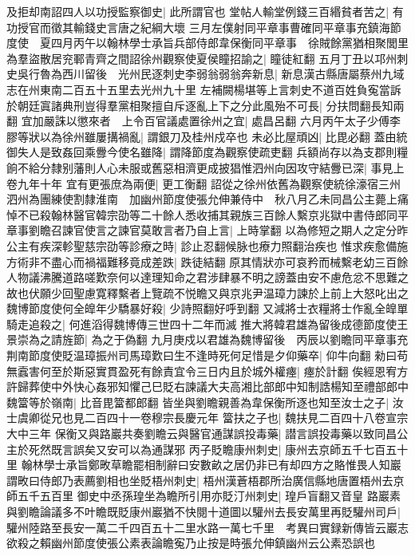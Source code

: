 及拒却南詔四人以功授監察御史|{
	此所謂官也}
堂帖人輸堂例錢三百緡貧者苦之|{
	有功授官而徵其輸錢史言唐之紀綱大壞}
三月左僕射同平章事曹確同平章事充鎮海節度使　夏四月丙午以翰林學士承旨兵部侍郎韋保衡同平章事　徐賊餘黨猶相聚閭里為羣盜散居兖鄆青齊之間詔徐州觀察使夏侯瞳招諭之|{
	瞳徒紅翻}
五月丁丑以邛州刺史吳行魯為西川留後　光州民逐刺史李弱翁弱翁奔新息|{
	新息漢古縣唐屬蔡州九域志在州東南二百五十五里去光州九十里}
左補闕楊堪等上言刺史不道百姓負寃當訴於朝廷寘諸典刑豈得羣黨相聚擅自斥逐亂上下之分此風殆不可長|{
	分扶問翻長知兩翻}
宜加嚴誅以懲來者　上令百官議處置徐州之宜|{
	處昌呂翻}
六月丙午太子少傅李膠等狀以為徐州雖屢搆禍亂|{
	謂銀刀及桂州戍卒也}
未必比屋頑凶|{
	比毘必翻}
蓋由統御失人是致姦回乘釁今使名雖降|{
	謂降節度為觀察使疏吏翻}
兵額尚存以為支郡則糧餉不給分隸别藩則人心未服或舊惡相濟更成披猖惟泗州向因攻守結釁已深|{
	事見上卷九年十年}
宜有更張庶為兩便|{
	更工衡翻}
詔從之徐州依舊為觀察使統徐濠宿三州泗州為團練使割隸淮南　加幽州節度使張允伸兼侍中　秋八月乙未同昌公主薨上痛悼不已殺翰林醫官韓宗劭等二十餘人悉收捕其親族三百餘人繫京兆獄中書侍郎同平章事劉瞻召諫官使言之諫官莫敢言者乃自上言|{
	上時掌翻}
以為修短之期人之定分昨公主有疾深軫聖慈宗劭等診療之時|{
	診止忍翻候脉也療力照翻治疾也}
惟求疾愈備施方術非不盡心而禍福難移竟成差跌|{
	跌徒結翻}
原其情狀亦可哀矜而械繫老幼三百餘人物議沸騰道路嗟歎奈何以達理知命之君涉肆暴不明之謗蓋由安不慮危忿不思難之故也伏願少回聖慮寛釋繫者上覽疏不悦瞻又與京兆尹温璋力諫於上前上大怒叱出之　魏博節度使何全皥年少驕暴好殺|{
	少詩照翻好呼到翻}
又減將士衣糧將士作亂全皥單騎走追殺之|{
	何進滔得魏博傳三世四十二年而滅}
推大將韓君雄為留後成德節度使王景崇為之請旌節|{
	為之于偽翻}
九月庚戍以君雄為魏博留後　丙辰以劉瞻同平章事充荆南節度使貶温璋振州司馬璋歎曰生不逢時死何足惜是夕仰藥卒|{
	仰牛向翻}
勑曰苟無蠧害何至於斯惡實貫盈死有餘責宜令三日内且於城外權瘞|{
	瘞於計翻}
俟經恩宥方許歸葬使中外快心姦邪知懼己巳貶右諫議大夫高湘比部郎中知制誥楊知至禮部郎中魏簹等於嶺南|{
	比音毘簹都郎翻}
皆坐與劉瞻親善為韋保衡所逐也知至汝士之子|{
	汝士虞卿從兄也見二百四十一卷穆宗長慶元年}
簹扶之子也|{
	魏扶見二百四十八卷宣宗大中三年}
保衡又與路巖共奏劉瞻云與醫官通謀誤投毒藥|{
	譛言誤投毒藥以致同昌公主於死然既言誤矣又安可以為通謀邪}
丙子貶瞻康州刺史|{
	康州去京師五千七百五十里}
翰林學士承旨鄭畋草瞻罷相制辭曰安數畝之居仍非已有却四方之賂惟畏人知巖謂畋曰侍郎乃表薦劉相也坐貶梧州刺史|{
	梧州漢蒼梧郡所治廣信縣地唐置梧州去京師五千五百里}
御史中丞孫瑝坐為瞻所引用亦貶汀州刺史|{
	瑝戶盲翻又音皇}
路巖素與劉瞻論議多不叶瞻既貶康州巖猶不快閱十道圖以驩州去長安萬里再貶驩州司戶|{
	驩州陸路至長安一萬二千四百五十二里水路一萬七千里　考異曰實録新傳皆云巖志欲殺之賴幽州節度使張公素表論瞻寃乃止按是時張允伸鎮幽州云公素恐誤也}
